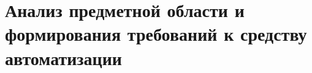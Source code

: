 \section{\large{Анализ предметной области и формирования требований к средству автоматизации}}





